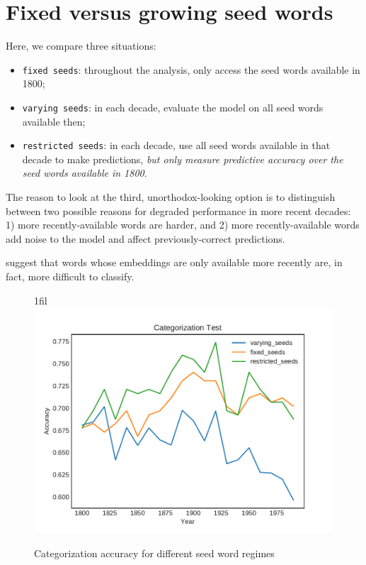 \documentclass{article}
\makeatletter
\newcommand*{\centerfloat}{%
  \parindent \z@
  \leftskip \z@ \@plus 1fil \@minus \textwidth
  \rightskip\leftskip
  \parfillskip \z@skip}
\makeatother
\begin{document}
\section{Fixed versus growing seed words}

Here, we compare three situations:

\begin{itemize}
    \item \texttt{fixed seeds}: throughout the analysis, only access the seed
        words available in 1800;
    \item \texttt{varying seeds}: in each decade, evaluate the model on all
        seed words available then;
    \item \texttt{restricted seeds}: in each decade, use all seed words
        available in that decade to make predictions, \textit{but only measure
        predictive accuracy over the seed words available in 1800}.
\end{itemize}

The reason to look at the third, unorthodox-looking option is to distinguish
between two possible reasons for degraded performance in more recent decades:
1) more recently-available words are harder, and 2) more recently-available
words add noise to the model and affect previously-correct predictions.

suggest that words whose embeddings are only available more recently are,
in fact, more difficult to classify.

\begin{figure}[H]
    \centerfloat
    \includegraphics[width=1.5\linewidth]{classification-centroid-fixed-varying-restricted-seeds/results_categorization_test.pdf}
    \caption{Categorization accuracy for different seed word regimes}
    \label{fig:seeds-categorization}
\end{figure}
\end{document}
